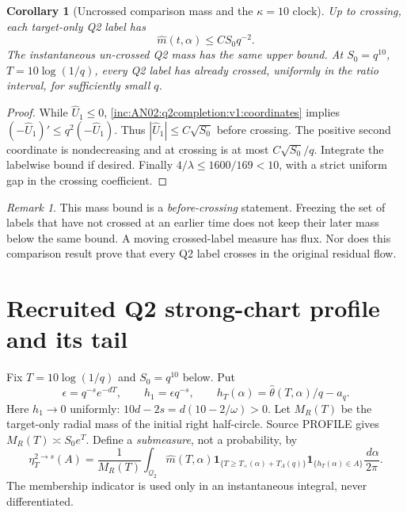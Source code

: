 \documentclass[11pt]{article}
\newtheorem{corollary}[theorem]{Corollary}
\theoremstyle{remark}\newtheorem{remark}[theorem]{Remark}
\newcommand{\dd}{\,d}\newcommand{\E}{\mathbb E}
\newcommand{\Qtwo}{\mathcal Q_2}
\begin{document}
\begin{corollary}[Uncrossed comparison mass and the $\kappa=10$ clock]
\label{inc:AN02:q2completion:v1:uncrossed}
Up to crossing, each target-only Q2 label has
\[
 \widehat m(t,\alpha)\le C S_0q^{-2}.
\]
The instantaneous un-crossed Q2 mass has the same upper bound. At $S_0=q^{10}$, $T=10\log(1/q)$, every Q2 label has already crossed, uniformly in the ratio interval, for sufficiently small $q$.
\end{corollary}
\begin{proof}
While $\widehat U_1\le0$, \eqref{inc:AN02:q2completion:v1:coordinates} implies $(-\widehat U_1)'\le q^2(-\widehat U_1)$. Thus $|\widehat U_1|\le C\sqrt{S_0}$ before crossing. The positive second coordinate is nondecreasing and at crossing is at most $C\sqrt{S_0}/q$. Integrate the labelwise bound if desired. Finally $4/\lambda\le1600/169<10$, with a strict uniform gap in the crossing coefficient.
\end{proof}
\begin{remark}
This mass bound is a \emph{before-crossing} statement. Freezing the set of labels that have not crossed at an earlier time does not keep their later mass below the same bound. A moving crossed-label measure has flux. Nor does this comparison result prove that every Q2 label crosses in the original residual flow.
\end{remark}

\section{Recruited Q2 strong-chart profile and its tail}
Fix $T=10\log(1/q)$ and $S_0=q^{10}$ below. Put
\[
 \epsilon=q^{-s}e^{-dT},\qquad h_1=\epsilon q^{-s},\qquad
 h_T(\alpha)=\widehat\theta(T,\alpha)/q-a_q.
\]
Here $h_1\to0$ uniformly: $10d-2s=d(10-2/\omega)>0$.
Let $M_R(T)$ be the target-only radial mass of the initial right half-circle. Source PROFILE gives $M_R(T)\asymp S_0e^T$. Define a \emph{submeasure}, not a probability, by
\[
 \eta_T^{2\to s}(A)=\frac1{M_R(T)}
 \int_{\Qtwo}\widehat m(T,\alpha)
 \mathbf1_{\{T\ge T_\times(\alpha)+T_A(q)\}}
 \mathbf1_{\{h_T(\alpha)\in A\}}\frac{\dd\alpha}{2\pi}.
\]
The membership indicator is used only in an instantaneous integral, never differentiated.
\end{document}
